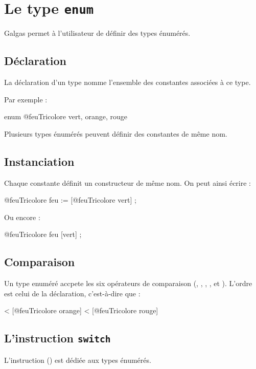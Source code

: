 
\chapter{Le type \texttt{enum}}

Galgas permet à l'utilisateur de définir des types énumérés.

\section{Déclaration}

La déclaration d'un type  nomme l'ensemble des constantes associées à ce type.

Par exemple :

\begin{galgascode}
enum @feuTricolore {
  vert, orange, rouge   
}
\end{galgascode}

Plusieurs types énumérés peuvent définir des constantes de même nom.

\section{Instanciation}

Chaque constante définit un constructeur de même nom. On peut ainsi écrire :

\begin{galgascode}
@feuTricolore feu := [@feuTricolore vert] ;
\end{galgascode}

Ou encore :

\begin{galgascode}
@feuTricolore feu [vert] ;
\end{galgascode}

\section{Comparaison}

Un type enuméré accpete les six opérateurs de comparaison (\galgas{==}, \galgas{\!=}, \galgas{<}, \galgas{<=}, \galgas{>} et \galgas{>}). L'ordre est celui de la déclaration, c'est-à-dire que :
\begin{galgascode}
   < [@feuTricolore orange] < [@feuTricolore rouge]
\end{galgascode}


\section{L'instruction \texttt{switch}}

L'instruction  () est dédiée aux types énumérés.
